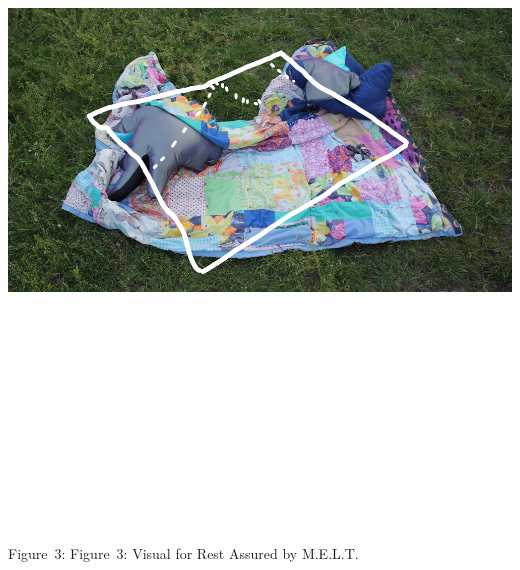 \includegraphics[width=13.88889in,height=7.81944in]{./media_02_Crip-Tic_of_Vignettes/Pictures/2.png}

Figure~3: Figure~3: Visual for Rest Assured by M.E.L.T.

